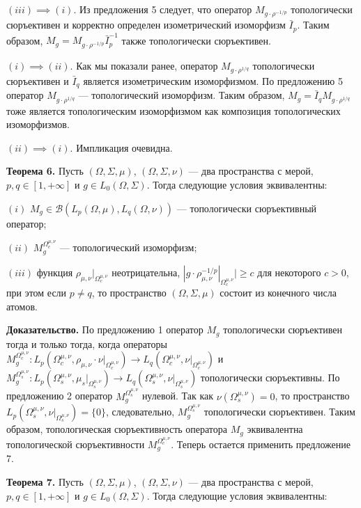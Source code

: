 \documentclass[11pt,twoside]{article}
\begin{document}
$(iii)$$\implies$$ (i)$. Из предложения 5 следует, что оператор $M_{g\cdot\rho^{-1/p}}$ топологически сюръективен и корректно определен изометрический изоморфизм $\bar{I}_p$. Таким образом, $M_g= M_{g\cdot\rho^{-1/p}}\bar{I}_p^{-1}$ также топологически сюръективен.

$(i)$$\implies$$ (ii)$. Как мы показали ранее, оператор $M_{g\cdot\rho^{1/q}}$ топологически сюръективен и $\bar{I}_q$ является изометрическим изоморфизмом. По предложению 5 оператор $M_{g\cdot\rho^{1/q}}$ --- топологический изоморфизм. Таким образом, $M_g=\bar{I}_q M_{g\cdot\rho^{1/q}}$ тоже является топологическим изоморфизмом как композиция топологических изоморфизмов.

$(ii)$$\implies$$ (i)$. Импликация очевидна.


\textbf{Теорема 6.} Пусть $(\Omega,\Sigma,\mu)$, $(\Omega,\Sigma,\nu)$ --- два пространства с мерой, $p,q\in[1,+\infty]$ и $g\in L_0(\Omega,\Sigma)$. Тогда следующие условия эквивалентны:

$(i)$ $M_g\in\mathcal{B}(L_p(\Omega,\mu), L_q(\Omega,\nu))$ --- топологически сюръективный оператор;

$(ii)$ $M_g^{\Omega_c^{\mu,\nu}}$ --- топологический изоморфизм;

$(iii)$ функция $\rho_{\mu,\nu}|_{\Omega_c^{\mu,\nu}}$ неотрицательна, $|g\cdot\rho_{\mu,\nu}^{-1/p}|_{\Omega_c^{\mu,\nu}}|\geq c$ для некоторого $c>0$, при этом если $p\neq q$, то пространство $(\Omega,\Sigma,\mu)$ состоит из конечного числа атомов.

\textbf{Доказательство.} По предложению 1 оператор $M_g$ топологически сюръективен тогда и только тогда, когда операторы $M_g^{\Omega_c^{\mu,\nu}}:L_p(\Omega_c^{\mu,\nu},\rho_{\mu,\nu}\cdot\nu|_{\Omega_c^{\mu,\nu}})\to L_q(\Omega_c^{\mu,\nu},\nu|_{\Omega_c^{\mu,\nu}})$ и $M_g^{\Omega_s^{\mu,\nu}}:L_p(\Omega_s^{\mu,\nu},\mu_s|_{\Omega_s^{\mu,\nu}})\to L_q(\Omega_s^{\mu,\nu},\nu|_{\Omega_s^{\mu,\nu}})$ топологически сюръективны. По предложению 2 оператор $M_g^{\Omega_s^{\mu,\nu}}$ нулевой. Так как $\nu(\Omega_s^{\mu,\nu})=0$, то пространство $L_p(\Omega_s^{\mu,\nu},\nu|_{\Omega_s^{\mu,\nu}})=\{0\}$, следовательно, $M_g^{\Omega_s^{\mu,\nu}}$ топологически сюръективен. Таким образом, топологическая сюръективность оператора $M_g$ эквивалентна топологической сюръективности  $M_g^{\Omega_c^{\mu,\nu}}$. Теперь остается применить предложение 7.


\textbf{Теорема 7.} Пусть $(\Omega,\Sigma,\mu)$, $(\Omega,\Sigma,\nu)$ --- два пространства с мерой, $p,q\in[1,+\infty]$ и $g\in L_0(\Omega,\Sigma)$. Тогда следующие условия эквивалентны:
\end{document}
